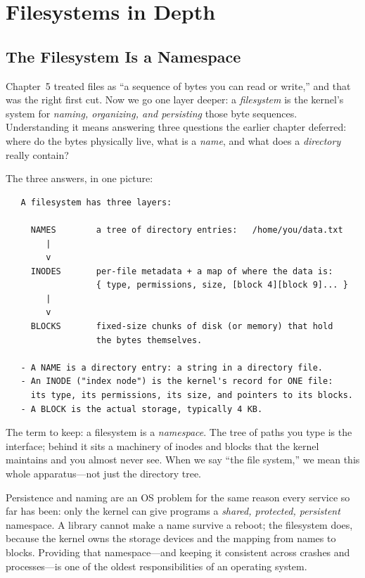 
\chapter{Filesystems in Depth}

\section{The Filesystem Is a Namespace}

Chapter~5 treated files as ``a sequence of bytes you can read or
write,'' and that was the right first cut. Now we go one layer deeper:
a \emph{filesystem} is the kernel's system for \emph{naming,
organizing, and persisting} those byte sequences. Understanding it
means answering three questions the earlier chapter deferred: where do
the bytes physically live, what is a \emph{name}, and what does a
\emph{directory} really contain?

The three answers, in one picture:

\begin{verbatim}
   A filesystem has three layers:

     NAMES        a tree of directory entries:   /home/you/data.txt
        |
        v
     INODES       per-file metadata + a map of where the data is:
                  { type, permissions, size, [block 4][block 9]... }
        |
        v
     BLOCKS       fixed-size chunks of disk (or memory) that hold
                  the bytes themselves.

   - A NAME is a directory entry: a string in a directory file.
   - An INODE ("index node") is the kernel's record for ONE file:
     its type, its permissions, its size, and pointers to its blocks.
   - A BLOCK is the actual storage, typically 4 KB.
\end{verbatim}

The term to keep: a filesystem is a \emph{namespace}. The tree of
paths you type is the interface; behind it sits a machinery of inodes
and blocks that the kernel maintains and you almost never see. When we
say ``the file system,'' we mean this whole apparatus---not just the
directory tree.

\begin{osconcept}
Persistence and naming are an OS problem for the same reason every
service so far has been: only the kernel can give programs a
\emph{shared, protected, persistent} namespace. A library cannot make a
name survive a reboot; the filesystem does, because the kernel owns
the storage devices and the mapping from names to blocks. Providing
that namespace---and keeping it consistent across crashes and
processes---is one of the oldest responsibilities of an operating
system.
\end{osconcept}

